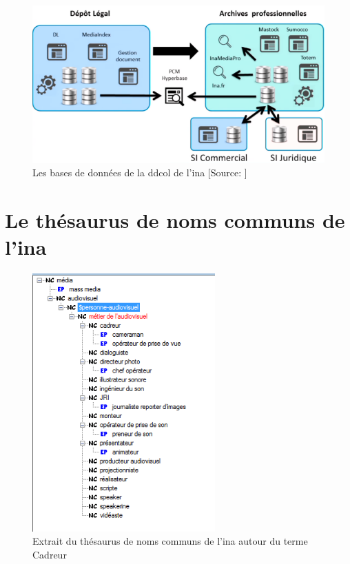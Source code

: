 \begin{figure}[!h]
	\centering
	\includegraphics[width=15cm]{images/bases_ddcol.png}
	\medskip
	\caption[Les bases de données de la \ac{ddcol} de l'\ac{ina}]{Les bases de données de la \ac{ddcol} de l'\ac{ina} [Source: \cite{poupeau_rassembler_2019}]}
	\label{bdd_ddcol_ina}
\end{figure}


\chapter{\label{annexe_thesaurus}Le thésaurus de noms communs de l'\ac{ina}}

\begin{figure}[!h]
	\centering
	\includegraphics[width=7cm]{images/cadreur_hierarchie.png}
	\medskip
	\caption[Extrait du thésaurus de noms communs de l'\ac{ina}]{Extrait du thésaurus de noms communs de l'\ac{ina} autour du terme \og Cadreur\fg{}}
	\label{thesaurus_cadreur}
\end{figure}

